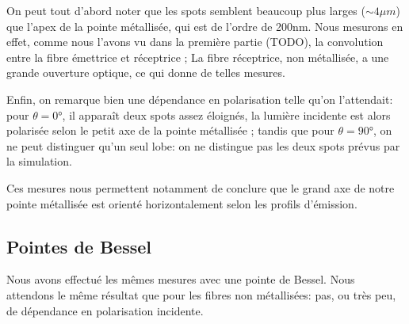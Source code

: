 On peut tout d'abord noter que les spots semblent beaucoup plus larges ($\sim 4\mu m$) que l'apex de la pointe métallisée, qui est de l'ordre de 200nm. Nous mesurons en effet, comme nous l'avons vu dans la première partie (TODO), la convolution entre la fibre émettrice et réceptrice ; La fibre réceptrice, non métallisée, a une grande ouverture optique, ce qui donne de telles mesures.

Enfin, on remarque bien une dépendance en polarisation telle qu'on l'attendait: pour $\theta = 0\si{\degree}$, il apparaît deux spots assez éloignés, la lumière incidente est alors polarisée selon le petit axe de la pointe métallisée ; tandis que pour  $\theta = 90\si{\degree}$, on ne peut distinguer qu'un seul lobe: on ne distingue pas les deux spots prévus par la simulation.

Ces mesures nous permettent notamment de conclure que le grand axe de notre pointe métallisée est orienté horizontalement selon les profils d'émission.





\subsection{Pointes de Bessel}
Nous avons effectué les mêmes mesures avec une pointe de Bessel. Nous attendons le même résultat que pour les fibres non métallisées: pas, ou très peu, de dépendance en polarisation incidente.

